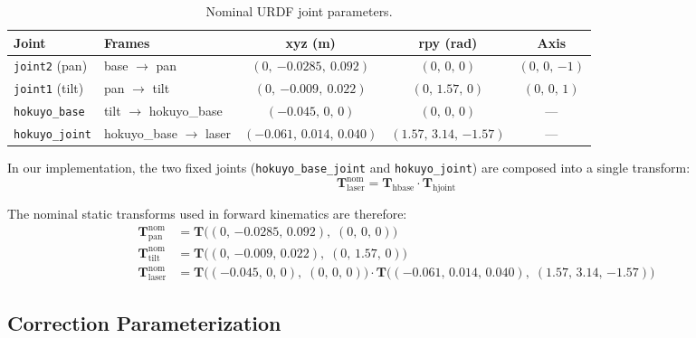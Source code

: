 \documentclass[12pt,a4paper]{article}
\newcommand{\T}{\mathbf{T}}
\newcommand{\code}[1]{\texttt{#1}}
\begin{document}
\begin{table}[H]
\centering
\caption{Nominal URDF joint parameters.}
\label{tab:nominal_urdf}
\begin{tabular}{@{}llccc@{}}
\toprule
Joint & Frames & xyz (m) & rpy (rad) & Axis \\
\midrule
\code{joint2} (pan) & base $\to$ pan
    & $(0,\ {-0.0285},\ 0.092)$ & $(0,\, 0,\, 0)$ & $(0,\,0,\,{-1})$ \\
\code{joint1} (tilt) & pan $\to$ tilt
    & $(0,\ {-0.009},\ 0.022)$ & $(0,\, 1.57,\, 0)$ & $(0,\,0,\,1)$ \\
\code{hokuyo\_base} & tilt $\to$ hokuyo\_base
    & $(-0.045,\, 0,\, 0)$ & $(0,\, 0,\, 0)$ & --- \\
\code{hokuyo\_joint} & hokuyo\_base $\to$ laser
    & $(-0.061,\, 0.014,\, 0.040)$ & $(1.57,\, 3.14,\, {-1.57})$ & --- \\
\bottomrule
\end{tabular}
\end{table}

In our implementation, the two fixed joints (\code{hokuyo\_base\_joint}
and \code{hokuyo\_joint}) are composed into a single transform:
\begin{equation}
    \T_{\text{laser}}^{\text{nom}} = \T_{\text{hbase}} \cdot \T_{\text{hjoint}}
    \label{eq:T_laser_nominal}
\end{equation}

The nominal static transforms used in forward kinematics are therefore:
\begin{align}
    \T_{\text{pan}}^{\text{nom}} &= \T\bigl((0,\, {-0.0285},\, 0.092),\; (0,\,0,\,0)\bigr)
    \label{eq:T_pan_nom} \\
    \T_{\text{tilt}}^{\text{nom}} &= \T\bigl((0,\, {-0.009},\, 0.022),\; (0,\, 1.57,\, 0)\bigr)
    \label{eq:T_tilt_nom} \\
    \T_{\text{laser}}^{\text{nom}} &= \T\bigl(({-0.045},\, 0,\, 0),\; (0,\,0,\,0)\bigr)
    \cdot \T\bigl(({-0.061},\, 0.014,\, 0.040),\; (1.57,\, 3.14,\, {-1.57})\bigr)
    \label{eq:T_laser_nom}
\end{align}

\subsection{Correction Parameterization}
\label{sec:correction_param}
\end{document}
